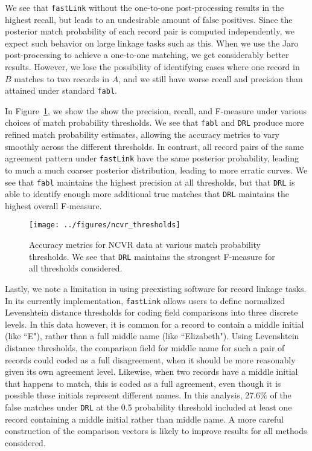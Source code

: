 \documentclass[12pt,letterpaper]{article}
\newcommand{\1}[1]{\mathbb{I}\!\left[#1\right]} %
\begin{document}
We see that \texttt{fastLink} without the one-to-one post-processing results in the highest recall, but leads to an undesirable amount of false positives. Since the posterior match probability of each record pair is computed independently, we expect such behavior on large linkage tasks such as this. When we use the Jaro post-processing to achieve a one-to-one matching, we get considerably better results. However, we lose the possibility of identifying cases where one record in $B$ matches to two records in $A$, and we still have worse recall and precision than attained under standard \texttt{fabl}. 

In Figure~\ref{fig:ncvr_thresholds}, we show the show the precision, recall, and F-measure under various choices of match probability thresholds. We see that \texttt{fabl} and \texttt{DRL} produce more refined match probability estimates, allowing the accuracy metrics to vary smoothly across the different thresholds. In contrast, all record pairs of the same agreement pattern under \texttt{fastLink} have the same posterior probability, leading to much a much coarser posterior distribution, leading to more erratic curves. We see that \texttt{fabl} maintains the highest precision at all thresholds, but that \texttt{DRL} is able to identify enough more additional true matches that \texttt{DRL} maintains the highest overall F-measure.
\begin{figure}[t]
	\centering
	\texttt{[image: ../figures/ncvr\_thresholds]}
	\caption{Accuracy metrics for NCVR data at various match probability thresholds. We see that \texttt{DRL} maintains the strongest F-measure for all thresholds considered.}
	\label{fig:ncvr_thresholds}
\end{figure}

Lastly, we note a limitation in using preexisting software for record linkage tasks. In its currently implementation, \texttt{fastLink} allows users to define normalized Levenshtein distance thresholds for coding field comparisons into three discrete levels. In this data however, it is common for a record to contain a middle initial (like ``E"), rather than a full middle name (like ``Elizabeth"). Using Levenshtein distance thresholds, the comparison field for middle name for such a pair of records could coded as a full disagreement, when it should be more reasonably given its own agreement level. Likewise, when two records have a middle initial that happens to match, this is coded as a full agreement, even though it is possible these initials represent different names. In this analysis, 27.6\% of the false matches under \texttt{DRL} at the 0.5 probability threshold included at least one record containing a middle initial rather than middle name. A more careful construction of the comparison vectors is likely to improve results for all methods considered.
\end{document}
